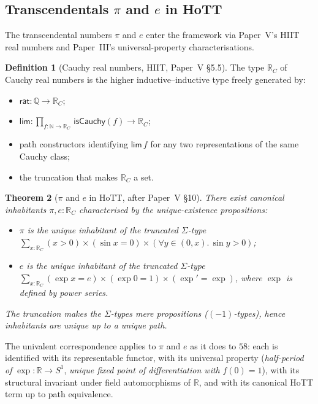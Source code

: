 \documentclass[12pt]{article}
\newtheorem{theorem}{Theorem}[section]
\theoremstyle{definition}
\newtheorem{definition}[theorem]{Definition}
\theoremstyle{remark}
\newcommand{\N}{\mathbb{N}}
\newcommand{\Q}{\mathbb{Q}}
\newcommand{\R}{\mathbb{R}}
\begin{document}
\subsection{Transcendentals \texorpdfstring{$\pi$ and $e$}{pi and e} in HoTT}
\label{sec:transcendentals}

The transcendental numbers $\pi$ and $e$ enter the framework via Paper~V's
HIIT real numbers and Paper~III's universal-property characterisations.

\begin{definition}[Cauchy real numbers, HIIT, Paper~V \S5.5]
\label{def:R-HIIT}
The type $\R_C$ of Cauchy real numbers is the higher inductive--inductive
type freely generated by:
\begin{itemize}
\item $\mathsf{rat}\colon \Q \to \R_C$;
\item $\mathsf{lim}\colon \prod_{f : \N \to \R_C}\, \mathsf{isCauchy}(f) \to \R_C$;
\item path constructors identifying $\mathsf{lim}\,f$ for any two
representations of the same Cauchy class;
\item the truncation that makes $\R_C$ a set.
\end{itemize}
\end{definition}

\begin{theorem}[$\pi$ and $e$ in HoTT, after Paper~V \S10]
\label{thm:pi-e-hott}
There exist canonical inhabitants $\pi, e : \R_C$ characterised by the
unique-existence propositions:
\begin{itemize}
\item $\pi$ is the unique inhabitant of the truncated $\Sigma$-type
$\sum_{x : \R_C} (x > 0) \times (\sin x = 0) \times (\forall y \in (0, x).\, \sin y > 0)$;
\item $e$ is the unique inhabitant of the truncated $\Sigma$-type
$\sum_{x : \R_C} (\exp x = e) \times (\exp 0 = 1) \times (\exp' = \exp)$,
where $\exp$ is defined by power series.
\end{itemize}
The truncation makes the $\Sigma$-types mere propositions ($(-1)$-types),
hence inhabitants are unique up to a unique path.
\end{theorem}

The univalent correspondence applies to $\pi$ and $e$ as it does to $58$:
each is identified with its representable functor, with its universal
property (\emph{half-period of} $\exp\colon \R \to S^1$, \emph{unique fixed
point of differentiation with} $f(0) = 1$), with its structural invariant
under field automorphisms of $\R$, and with its canonical HoTT term up to
path equivalence.
\end{document}
